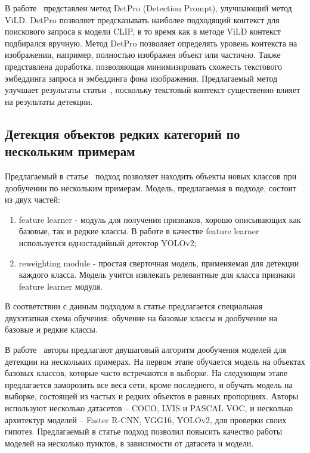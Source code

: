 \documentclass[a4paper,14pt]{article}
\begin{document}
    В работе~\cite{detpro} представлен метод DetPro (Detection Prompt), улучшающий метод ViLD. 
    DetPro позволяет предсказывать наиболее подходящий контекст для поискового запроса к модели CLIP, в то время как в методе ViLD контекст подбирался вручную.
    Метод DetPro позволяет определять уровень контекста на изображении, например, полностью изображен объект или частично.
    Также представлена доработка, позволяющая минимизировать схожесть текстового эмбеддинга запроса и эмбеддинга фона изображения.
    Предлагаемый метод улучшает результаты статьи~\cite{ViLD}, поскольку текстовый контекст существенно влияет на результаты детекции.

    \subsection{Детекция объектов редких категорий по нескольким примерам}
    
    Предлагаемый в статье~\cite{FSODFeatureReweighting} подход позволяет находить объекты новых классов при дообучении по нескольким примерам.
    Модель, предлагаемая в подходе, состоит из двух частей: 
     \begin{enumerate}
    	[1)]
    	\itemsep0em
    	\item feature learner - модуль для получения признаков, хорошо описывающих как базовые, так и редкие классы. 
    	В работе в качестве feature learner используется одностадийный детектор YOLOv2;
    	\item reweighting module - простая сверточная модель, применяемая для детекции каждого класса. Модель учится извлекать релевантные для класса признаки feature learner модуля.
    \end{enumerate}
	В соответствии с данным подходом в статье предлагается специальная двухэтапная схема обучения: обучение на базовые классы и дообучение на базовые и редкие классы.

    В работе~\cite{wang2020few} авторы предлагают двушаговый алгоритм дообучения моделей для детекции на нескольких примерах.
    На первом этапе обучается модель на объектах базовых классов, которые часто встречаются в выборке.
    На следующем этапе предлагается заморозить все веса сети, кроме последнего, и обучать модель на выборке, состоящей из частых и редких объектов в равных пропорциях.
    Авторы используют несколько датасетов -- COCO, LVIS и PASCAL VOC,
    и несколько архитектур моделей -- Faster R-CNN, VGG16, YOLOv2, для проверки своих гипотез.
    Предлагаемый в статье подход позволил повысить качество работы моделей на несколько пунктов, в зависимости от датасета и модели.
    
\end{document}
